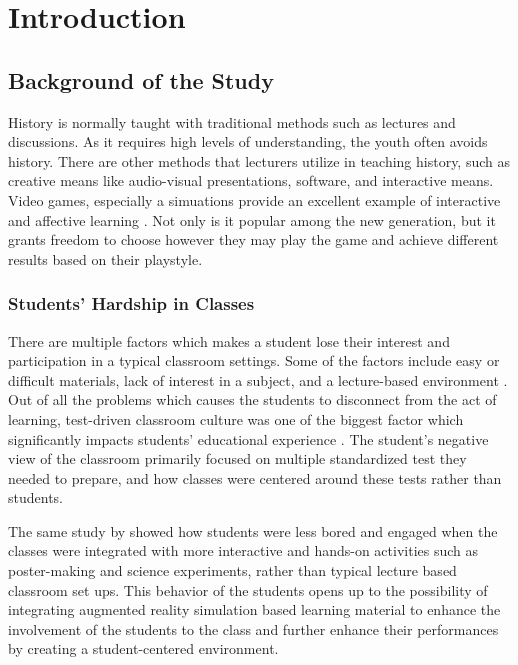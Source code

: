 %
%
%                 

\chapter{Introduction}
\label{sec:intro}   
\section{Background of the Study}
\label{sec:overview}

History is normally taught with traditional methods such as lectures and discussions. As it requires high levels of understanding, the youth often avoids history. There are other methods that lecturers utilize in teaching history, such as creative means like audio-visual presentations, software, and interactive means. Video games, especially a simuations provide an excellent example of interactive and affective learning \cite{ARVRRome}. Not only is it popular among the new generation, but it grants freedom to choose however they may play the game and achieve different results based on their playstyle.
 
\subsection{Students' Hardship in Classes}
There are multiple factors which makes a student lose their interest and participation in a typical classroom settings. Some of the factors include easy or difficult materials, lack of interest in a subject, and a lecture-based environment \cite{medium:mosley}. Out of all the problems which causes the students to disconnect from the act of learning, test-driven classroom culture was one of the biggest factor which significantly impacts students' educational experience \cite{mora}. The student's negative view of the classroom primarily focused on multiple standardized test they needed to prepare, and how classes were centered around these tests rather than students.

The same study by \cite{mora} showed how students were less bored and engaged when the classes were integrated with more interactive and hands-on activities such as poster-making and science experiments, rather than typical lecture based classroom set ups. This behavior of the students opens up to the possibility of integrating augmented reality simulation based learning material to enhance the involvement of the students to the class and further enhance their performances by creating a student-centered environment.


